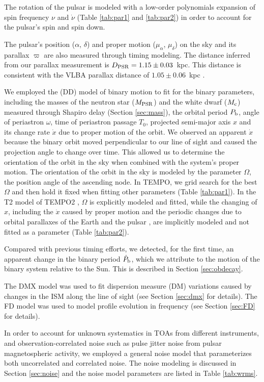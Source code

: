 The rotation of the pulsar is modeled with a low-order polynomials expansion of spin frequency 
$\nu$ and $\dot{\nu}$ (Table \ref{tab:par1} and \ref{tab:par2}) in order to account
for the pulsar's spin and spin down.

The pulsar's position ($\alpha$, $\delta$) and proper motion ($\mu_\alpha$, $
\mu_\delta$) on the sky and its parallax $\varpi$ are also measured through timing modeling. 
The distance inferred from our parallax
measurement is $D_{\rm PSR}=1.15\pm0.03$~kpc. This distance is consistent with 
the VLBA parallax distance of $1.05\pm0.06$~kpc \citep{cbv+09}.

We employed the \citet{dd86} (DD) model of binary motion to fit for the binary parameters, 
including the masses of
the neutron star ($M_{\rm PSR}$) and the white dwarf ($M_{\rm c}$) measured
through Shapiro delay (Section \ref{sec:mass}),
the orbital period $P_{\rm b}$, angle of periastron $\omega$, time of
periastron passage $T_0$, projected semi-major axis $x$ and its change rate
$\dot{x}$ due to proper motion of the orbit. 
We observed an apparent $\dot{x}$ because the binary orbit moved perpendicular
to our line of sight and caused the projection angle to change over time. This 
allowed us to determine the orientation of the orbit in the sky when combined
with the system's proper motion.
The orientation of the orbit in the sky is modeled by the
parameter $\Omega$, the position angle of the ascending node.
In {\sc TEMPO}, we grid search for the best $\Omega$ and then hold it fixed when fitting other
parameters (Table \ref{tab:par1}).
In the T2 model of {\sc TEMPO2} \citep{ehm06}, $\Omega$ is explicitly modeled and
fitted, while the changing of $x$, including the $\dot{x}$ caused by proper motion and the 
periodic changes due to orbital parallaxes of the Earth and the pulsar \citep{kop96}, are implicitly modeled and not fitted as a parameter
(Table \ref{tab:par2}).  
%


Compared with previous timing efforts, we detected, for the first time, an
apparent change in the binary period $\dot{P}_{\rm b}$, which we attribute to
the motion of the binary system relative to the Sun. This is described in Section \ref{sec:obdecay}.    

The DMX model was used to fit dispersion measure (DM) variations caused by
changes in the ISM along the line of sight (see Section \ref{sec:dmx} for details). The FD model was used to model profile
evolution in frequency (see Section \ref{sec:FD} for details). 

In order to account for unknown systematics in TOAs from different
instruments, and observation-correlated noise such as pulse jitter noise from pulsar
magnetospheric activity, we employed a general noise model that parameterizes both uncorrelated and
correlated noise. The noise modeling is discussed in Section \ref{sec:noise} and the
noise model parameters are listed in Table \ref{tab:wrms}. 

